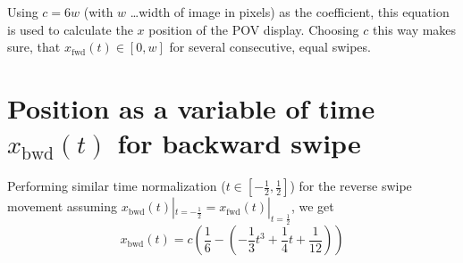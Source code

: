 \documentclass[a4paper, 11pt]{article}
\begin{document}
Using $c = 6 w$ (with $w$ \ldots width of image in pixels) as the coefficient, this equation is used to calculate the $x$ position of the POV display. Choosing $c$ this way makes sure, that $x_{\mathrm{fwd}}(t) \in [0, w]$ for several consecutive, equal swipes.

\section*{Position as a variable of time $x_{\mathrm{bwd}}(t)$ for backward swipe}
Performing similar time normalization ($t \in \left[-\frac{1}{2}, \frac{1}{2} \right]$) for the reverse swipe movement assuming $x_{\mathrm{bwd}}(t)|_{t = -\frac{1}{2}} = x_{\mathrm{fwd}}(t)|_{t = \frac{1}{2}}$, we get
\[
	x_{\mathrm{bwd}}(t) = c \left( \frac{1}{6} - \left (- \frac{1}{3} t^3 + \frac{1}{4} t + \frac{1}{12} \right) \right)
\]
\end{document}
